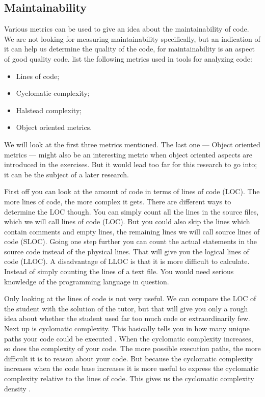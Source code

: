 \documentclass{article}
\begin{document}
\subsection{Maintainability}

Various metrics can be used to give an idea about the maintainability of
code. We are not looking for measuring maintainability specifically, but an
indication of it can help us determine the quality of the code, for
maintainability is an aspect of good quality code. \citet{rakic2013problems}
list the following metrics used in tools for analyzing code:
\begin{itemize}
  \item Lines of code;
  \item Cyclomatic complexity;
  \item Halstead complexity;
  \item Object oriented metrics.
\end{itemize}
We will look at the first three metrics mentioned. The last one --- Object
oriented metrics --- might also be an interesting metric when object oriented
aspects are introduced in the exercises. But it would lead too far for this
research to go into; it can be the subject of a later research.

First off you can look at the amount of code in terms of lines of code
(LOC). The more lines of code, the more complex it gets. There are different
ways to determine the LOC though. You can simply count all the lines in the
source files, which we will call lines of code (LOC). But you could also skip
the lines which contain comments and empty lines, the remaining lines we will
call source lines of code (SLOC). Going one step further you can count the
actual statements in the source code instead of the physical lines. That will
give you the logical lines of code (LLOC). A disadvantage of LLOC is that it is
more difficult to calculate. Instead of simply counting the lines of a text
file. You would need serious knowledge of the programming language in question.

Only looking at the lines of code is not very useful. We can compare the LOC of
the student with the solution of the tutor, but that will give you only a
rough idea about whether the student used far too much code or extraordinarily
few. Next up is cyclomatic complexity. This basically tells you in how many
unique paths your code could be executed \citep{website:js-complexity}. When
the cyclomatic complexity increases, so does the complexity of your code. The
more possible execution paths, the more difficult it is to reason about your
code. But because the cyclomatic complexity increases when the code base
increases it is more useful to express the cyclomatic complexity relative to
the lines of code. This gives us the cyclomatic complexity density
\citep{gill1991cyclomatic}.
\end{document}
